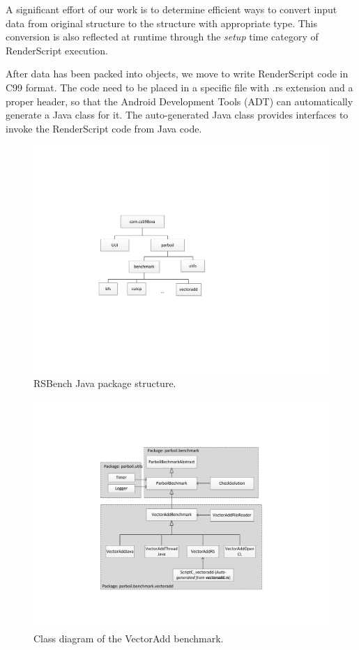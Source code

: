 A significant effort of our work is to determine efficient ways to convert input
data from original structure to the  structure with appropriate
 type. This conversion is also reflected at runtime through the
\textit{setup} time category of RenderScript execution.

After data has been packed into  objects, we move to write
RenderScript code in C99 format. The code need to be placed in a specific file
with .rs extension and a proper header, so that the Android Development Tools
(ADT) can automatically generate a Java class for it. The auto-generated Java
class provides interfaces to invoke the RenderScript code from Java code.

\begin{figure}[t!]
\centering
\includegraphics[scale=0.65]{figs/package_diagram.pdf}
\caption{RSBench Java package structure.}
\label{fig:package_structure}
\centering
\end{figure}


\begin{figure}[t!]
\centering
\includegraphics[scale=0.5]{figs/vectoradd_class_diagram.pdf}
\caption{Class diagram of the VectorAdd benchmark.}
\label{fig:class_diagram}
\centering
\end{figure}

